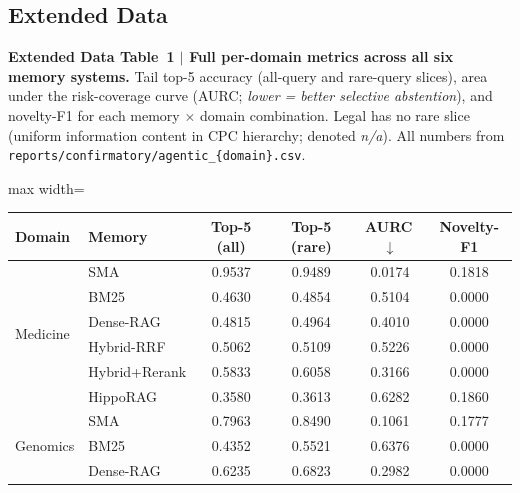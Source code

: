 \documentclass[pdflatex,sn-nature]{sn-jnl}
\newcommand{\edcaption}[1]{\par{\small #1}\par\smallskip}
\begin{document}
\begin{appendices}

\section*{Extended Data}


\begin{table}[htbp]
\centering
\edcaption{\textbf{Extended Data Table~1 $|$ Full per-domain metrics across all six memory
    systems.}
  Tail top-5 accuracy (all-query and rare-query slices), area under the
  risk-coverage curve (AURC; \emph{lower = better selective abstention}), and
  novelty-F1 for each memory $\times$ domain combination.
  Legal has no rare slice (uniform information content in CPC hierarchy;
  denoted \textit{n/a}).
  All numbers from \texttt{reports/confirmatory/agentic\_\{domain\}.csv}.}
\small
\setlength{\tabcolsep}{4pt}
\begin{adjustbox}{max width=\textwidth}\begin{tabular}{llcccc}
\toprule
\textbf{Domain} & \textbf{Memory} & \textbf{Top-5 (all)} & \textbf{Top-5 (rare)} & \textbf{AURC\,$\downarrow$} & \textbf{Novelty-F1} \\
\midrule
\multirow{6}{*}{Medicine}
  & SMA              & 0.9537 & 0.9489 & 0.0174 & 0.1818 \\
  & BM25             & 0.4630 & 0.4854 & 0.5104 & 0.0000 \\
  & Dense-RAG        & 0.4815 & 0.4964 & 0.4010 & 0.0000 \\
  & Hybrid-RRF       & 0.5062 & 0.5109 & 0.5226 & 0.0000 \\
  & Hybrid+Rerank    & 0.5833 & 0.6058 & 0.3166 & 0.0000 \\
  & HippoRAG         & 0.3580 & 0.3613 & 0.6282 & 0.1860 \\
\midrule
\multirow{6}{*}{Genomics}
  & SMA              & 0.7963 & 0.8490 & 0.1061 & 0.1777 \\
  & BM25             & 0.4352 & 0.5521 & 0.6376 & 0.0000 \\
  & Dense-RAG        & 0.6235 & 0.6823 & 0.2982 & 0.0000 \\

\end{tabular}
\end{adjustbox}
\end{table}
\end{appendices}
\end{document}
